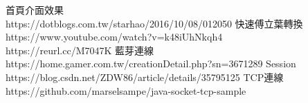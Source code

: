 \documentclass[12pt]{article}  %
\theoremstyle{plain}
\begin{document}



\begin{thebibliography}{99}  %
首頁介面效果\\
https://dotblogs.com.tw/starhao/2016/10/08/012050
快速傅立葉轉換\\
https://www.youtube.com/watch?v=k48iUhNkqh4 \\
https://reurl.cc/M7047K
藍芽連線\\
https://home.gamer.com.tw/creationDetail.php?sn=3671289
Session\\
https://blog.csdn.net/ZDW86/article/details/35795125
TCP連線\\
https://github.com/marselsampe/java-socket-tcp-sample
\end{thebibliography}
\newpage
\end{document}
